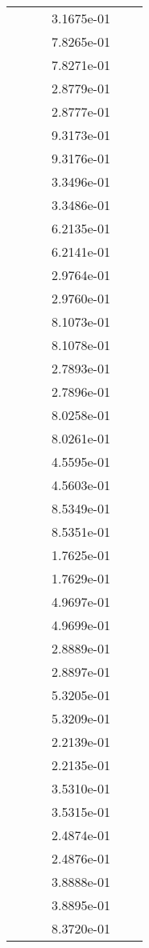 \begin{xltabular}{\textwidth}{r|rS[table-format=1.3e+2]S[table-format=1.4e+2]S[table-format=1.4e+2]S[table-format=-1.5]}
&  &  & 3.1675e-01 & & \\
&  &  & 7.8265e-01 & & \\
&  &  & 7.8271e-01 & & \\
&  &  & 2.8779e-01 & & \\
&  &  & 2.8777e-01 & & \\
&  &  & 9.3173e-01 & & \\
&  &  & 9.3176e-01 & & \\
&  &  & 3.3496e-01 & & \\
&  &  & 3.3486e-01 & & \\
&  &  & 6.2135e-01 & & \\
&  &  & 6.2141e-01 & & \\
&  &  & 2.9764e-01 & & \\
&  &  & 2.9760e-01 & & \\
&  &  & 8.1073e-01 & & \\
&  &  & 8.1078e-01 & & \\
&  &  & 2.7893e-01 & & \\
&  &  & 2.7896e-01 & & \\
&  &  & 8.0258e-01 & & \\
&  &  & 8.0261e-01 & & \\
&  &  & 4.5595e-01 & & \\
&  &  & 4.5603e-01 & & \\
&  &  & 8.5349e-01 & & \\
&  &  & 8.5351e-01 & & \\
&  &  & 1.7625e-01 & & \\
&  &  & 1.7629e-01 & & \\
&  &  & 4.9697e-01 & & \\
&  &  & 4.9699e-01 & & \\
&  &  & 2.8889e-01 & & \\
&  &  & 2.8897e-01 & & \\
&  &  & 5.3205e-01 & & \\
&  &  & 5.3209e-01 & & \\
&  &  & 2.2139e-01 & & \\
&  &  & 2.2135e-01 & & \\
&  &  & 3.5310e-01 & & \\
&  &  & 3.5315e-01 & & \\
&  &  & 2.4874e-01 & & \\
&  &  & 2.4876e-01 & & \\
&  &  & 3.8888e-01 & & \\
&  &  & 3.8895e-01 & & \\
&  &  & 8.3720e-01 & & \\

\end{xltabular}
